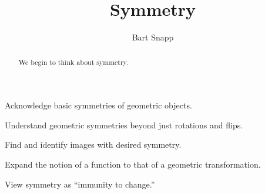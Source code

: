 \documentclass[noauthor,nooutcomes,12pt]{ximera}
\title{Symmetry}
\author{Bart Snapp}
\begin{document}
\begin{abstract}
  We begin to think about symmetry.
\end{abstract}
\maketitle

\begin{listOutcomes}
\item Acknowledge basic symmetries of geometric objects.
\item Understand geometric symmetries beyond just rotations and flips.
\item Find and identify images with desired symmetry.
\item Expand the notion of a function to that of a geometric
  transformation.
\item View symmetry as ``immunity to change.''
\end{listOutcomes}
\mynewpage
\end{document}
